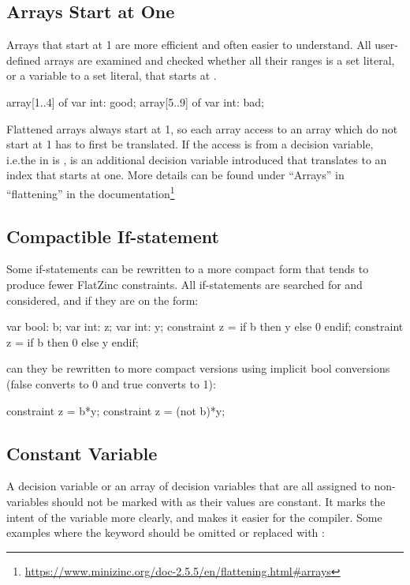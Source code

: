 \documentclass[a4paper,12pt]{article}
\begin{document}
\subsection{Arrays Start at One}\label{sec:rule:arrayatone}
Arrays that start at 1 are more efficient and often easier to understand.
All user-defined arrays are examined and checked whether all their ranges is a set
literal, or a variable to a set literal, that starts at .
\begin{mznnobreak}
array[1..4] of var int: good;
array[5..9] of var int: bad;
\end{mznnobreak}
Flattened arrays always start at 1, so each array access to an array which do not start at
1 has to first be translated. If the access is from a decision variable, i.e.\@ the  in  is
, is an additional decision variable introduced that translates  to an index that
starts at one. More details can be found under ``Arrays'' in ``flattening'' in the
documentation\footnote{\url{https://www.minizinc.org/doc-2.5.5/en/flattening.html\#arrays}}

\subsection{Compactible If-statement}\label{sec:rule:compactif}
Some if-statements can be rewritten to a more compact form that tends to produce fewer
FlatZinc constraints. All if-statements are searched for and considered, and if they are on
the form:
\begin{mznnobreak}
var bool: b; var int: z; var int: y;
constraint z = if b then y else 0 endif;
constraint z = if b then 0 else y endif;
\end{mznnobreak}

can they be rewritten to more compact versions using implicit bool conversions (false converts
to 0 and true converts to 1):

\begin{mznnobreak}
constraint z = b*y;
constraint z = (not b)*y;
\end{mznnobreak}

\subsection{Constant Variable}\label{sec:rule:constvar}
A decision variable or an array of decision variables that are all assigned to non-variables should not be
marked with  as their values are constant. It marks the intent of the variable more
clearly, and makes it easier for the compiler. Some examples where the keyword 
should be omitted or replaced with :
\end{document}
